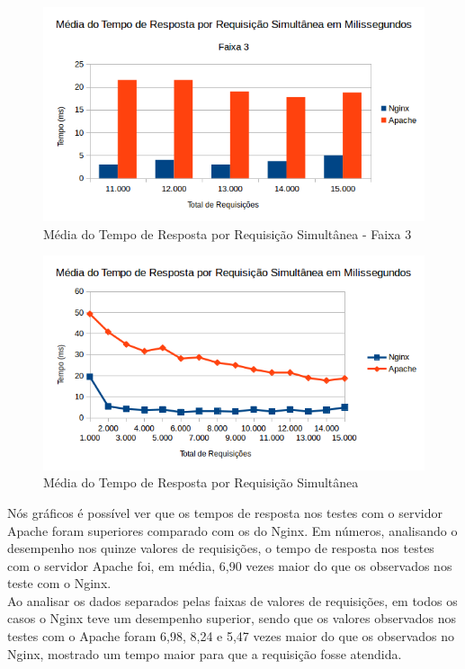 \begin{figure}[H]
	\centering
	\includegraphics[width=1\linewidth]{graficos/grafico5-f3} 
	\caption{Média do Tempo de Resposta por Requisição Simultânea - Faixa 3}
	\label{fig:grafico5-f3}
\end{figure}
\begin{figure}[H]
	\centering
	\includegraphics[width=1\linewidth]{graficos/grafico5} 
	\caption{Média do Tempo de Resposta por Requisição Simultânea}
	\label{fig:grafico5}
\end{figure}
Nós gráficos é possível ver que os tempos de resposta nos testes com o servidor 
Apache foram superiores comparado com os do Nginx. Em números, analisando o 
desempenho nos quinze valores de requisições, o tempo de resposta nos testes 
com o servidor Apache foi, em média, 6,90 vezes maior do que os observados nos 
teste com o Nginx.\\
Ao analisar os dados separados pelas faixas de valores de requisições, em todos 
os casos o Nginx teve um desempenho superior, sendo que os valores observados 
nos testes com o Apache foram 6,98, 8,24 e 5,47 vezes maior do que os 
observados no Nginx, mostrado um tempo maior para que a requisição fosse 
atendida.
